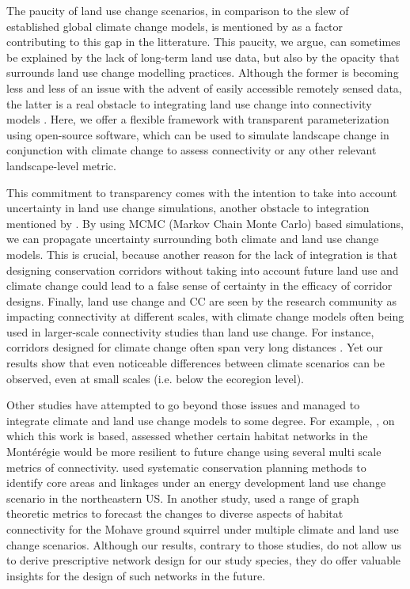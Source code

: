 The paucity of land use change scenarios, in comparison to the slew of established global climate change models, is mentioned by \cite{costanza_landscape_2019} as a factor contributing to this gap in the litterature. This paucity, we argue, can sometimes be explained by the lack of long-term land use data, but also by the opacity that surrounds land use change modelling practices. Although the former is becoming less and less of an issue with the advent of easily accessible remotely sensed data, the latter is a real obstacle to integrating land use change into connectivity models \citep{moulds_open_2015}. Here, we offer a flexible framework with transparent parameterization using open-source software, which can be used to simulate landscape change in conjunction with climate change to assess connectivity or any other relevant landscape-level metric. 

This commitment to transparency comes with the intention to take into account uncertainty in land use change simulations, another obstacle to integration mentioned by \cite{costanza_landscape_2019}. By using MCMC (Markov Chain Monte Carlo) based simulations, we can propagate uncertainty surrounding both climate and land use change models. This is crucial, because another reason for the lack of integration is that designing conservation corridors without taking into account future land use and climate change could lead to a false sense of certainty in the efficacy of corridor designs. Finally, land use change and CC are seen by the research community as impacting connectivity at different scales, with climate change models often being used in larger-scale connectivity studies than land use change. For instance, corridors designed for climate change often span very long distances \citep{mcguire_achieving_2016}. Yet our results show that even noticeable differences between climate scenarios can be observed, even at small scales (i.e. below the ecoregion level).

Other studies have attempted to go beyond those issues and managed to integrate climate and land use change models to some degree. For example, \cite{albert_applying_2017}, on which this work is based, assessed whether certain habitat networks in the Montérégie would be more resilient to future change using several multi scale metrics of connectivity. \cite{leonard_landscape-scale_2017} used systematic conservation planning methods to identify core areas and linkages under an energy development land use change scenario in the northeastern US. In another study, \cite{dilts_multiscale_2016} used a range of graph theoretic metrics to forecast the changes to diverse aspects of habitat connectivity for the Mohave ground squirrel under multiple climate and land use change scenarios. Although our results, contrary to those studies, do not allow us to derive prescriptive network design for our study species, they do offer valuable insights for the design of such networks in the future.

